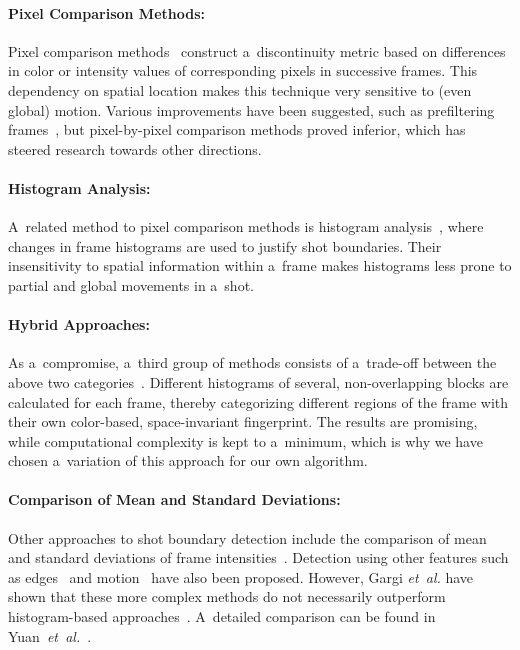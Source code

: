\paragraph{Pixel Comparison Methods:}

Pixel comparison methods~\cite{hampapur1994videosegmentation,
zhang1993videopartitioning} construct a~discontinuity metric
based on differences in color or intensity values
of corresponding pixels in successive frames.
This dependency on spatial location makes this technique
very sensitive to (even global) motion.
Various improvements have been suggested, such as prefiltering
frames~\cite{zhang1995videoparsing},
but pixel-by-pixel comparison methods proved inferior,
which has steered research towards other directions.

\paragraph{Histogram Analysis:}

A~related method to pixel comparison methods is
histogram analysis~\cite{otoole1999shotboundary},
where changes in frame histograms are used
to justify shot boundaries.
Their insensitivity to spatial information
within a~frame makes histograms less prone to partial
and global movements in a~shot.

\paragraph{Hybrid Approaches:}

As a~compromise, a~third group of methods consists of
a~trade-off between the above two
categories~\cite{ahmed1999keyframe}.
Different histograms of several, non-overlapping blocks
are calculated for each frame,
thereby categorizing different regions of the frame
with their own color-based, space-invariant fingerprint.
The results are promising, while computational complexity
is kept to a~minimum, which is why we have chosen
a~variation of this approach for our own algorithm.

\paragraph{Comparison of Mean and Standard Deviations:}

Other approaches to shot boundary detection include
the comparison of mean and standard deviations
of frame intensities~\cite{lienhart1999comparison}.
Detection using other features such as
edges~\cite{zabih1995scenebreaks} and
motion~\cite{bouthemy1997shotchange} have also been proposed.
However, Gargi \emph{et~al.} have shown that
these more complex methods do not necessarily
outperform histogram-based approaches~\cite{gargi2000videoshot}.
A~detailed comparison can be found in
Yuan~\emph{et~al.}~\cite{yuan2007shotboundary}.

